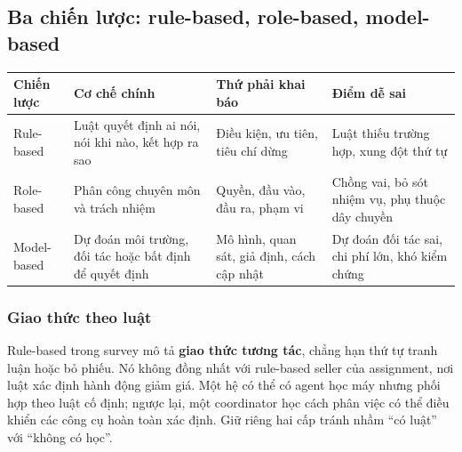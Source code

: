 \subsection{Ba chiến lược: rule-based, role-based,
model-based}\label{ba-chiux1ebfn-lux1b0ux1ee3c-rule-based-role-based-model-based}

{\def\LTcaptype{none} %
\begin{longtable}[]{@{}
  >{\raggedright\arraybackslash}p{}
  >{\raggedright\arraybackslash}p{}
  >{\raggedright\arraybackslash}p{}
  >{\raggedright\arraybackslash}p{}@{}}
\toprule\noalign{}
\begin{minipage}[b]{\linewidth}\raggedright
Chiến lược
\end{minipage} & \begin{minipage}[b]{\linewidth}\raggedright
Cơ chế chính
\end{minipage} & \begin{minipage}[b]{\linewidth}\raggedright
Thứ phải khai báo
\end{minipage} & \begin{minipage}[b]{\linewidth}\raggedright
Điểm dễ sai
\end{minipage} \\
\midrule\noalign{}
\endhead
\bottomrule\noalign{}
\endlastfoot
Rule-based & Luật quyết định ai nói, nói khi nào, kết hợp ra sao & Điều
kiện, ưu tiên, tiêu chí dừng & Luật thiếu trường hợp, xung đột thứ tự \\
Role-based & Phân công chuyên môn và trách nhiệm & Quyền, đầu vào, đầu
ra, phạm vi & Chồng vai, bỏ sót nhiệm vụ, phụ thuộc dây chuyền \\
Model-based & Dự đoán môi trường, đối tác hoặc bất định để quyết định &
Mô hình, quan sát, giả định, cách cập nhật & Dự đoán đối tác sai, chi
phí lớn, khó kiểm chứng \\
\end{longtable}
}

\subsubsection{Giao thức theo luật}\label{giao-thux1ee9c-theo-luux1eadt}

Rule-based trong survey mô tả \textbf{giao thức tương tác}, chẳng hạn
thứ tự tranh luận hoặc bỏ phiếu. Nó không đồng nhất với rule-based
seller của assignment, nơi luật xác định hành động giảm giá. Một hệ có
thể có agent học máy nhưng phối hợp theo luật cố định; ngược lại, một
coordinator học cách phân việc có thể điều khiển các công cụ hoàn toàn
xác định. Giữ riêng hai cấp tránh nhầm ``có luật'' với ``không có học''.

